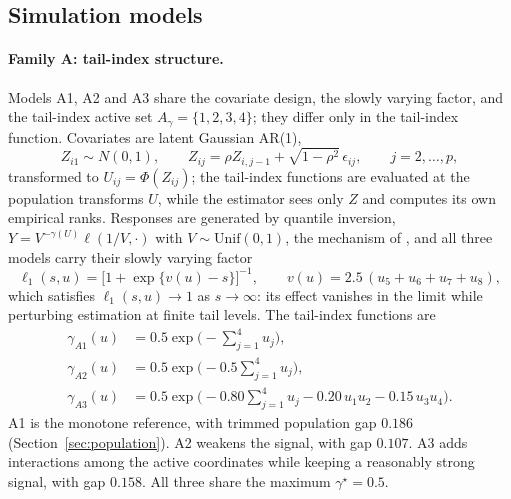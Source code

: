 \documentclass[bj,authoryear]{imsart}
\theoremstyle{plain}
\newcommand{\A}{A}\newcommand{\I}{I_\varepsilon}
\newcommand{\gmax}{\gamma^\star}
\begin{document}
\subsection{Simulation models}\label{sec:models}

\paragraph{Family A: tail-index structure.}
Models A1, A2 and A3 share the covariate design, the slowly varying
factor, and the tail-index active set $\A_\gamma=\{1,2,3,4\}$; they
differ only in the tail-index function. Covariates are latent Gaussian
AR(1),
\[
 Z_{i1}\sim N(0,1),\qquad
 Z_{ij}=\rho Z_{i,j-1}+\sqrt{1-\rho^2}\,\epsilon_{ij},
 \qquad j=2,\ldots,p,
\]
transformed to $U_{ij}=\Phi(Z_{ij})$; the tail-index functions are
evaluated at the population transforms $U$, while the estimator sees
only $Z$ and computes its own empirical ranks. Responses are generated
by quantile inversion, $Y=V^{-\gamma(U)}\ell(1/V,\cdot)$ with
$V\sim\mathrm{Unif}(0,1)$, the mechanism of
\citet{gardesPodgorny2025}, and all three models carry their slowly
varying factor
\[
 \ell_1(s,u)=\bigl[1+\exp\{v(u)-s\}\bigr]^{-1},
 \qquad
 v(u)=2.5\,(u_5+u_6+u_7+u_8),
\]
which satisfies $\ell_1(s,u)\to1$ as $s\to\infty$: its effect vanishes
in the limit while perturbing estimation at finite tail levels. The
tail-index functions are
\begin{align*}
 \gamma_{A1}(u)&=0.5\exp\bigl(-\textstyle\sum_{j=1}^4u_j\bigr),\\
 \gamma_{A2}(u)&=0.5\exp\bigl(-0.5\textstyle\sum_{j=1}^4u_j\bigr),\\
 \gamma_{A3}(u)&=0.5\exp\bigl(-0.80\textstyle\sum_{j=1}^4u_j
 -0.20\,u_1u_2-0.15\,u_3u_4\bigr).
\end{align*}
A1 is the monotone reference, with trimmed population gap $0.186$
(Section~\ref{sec:population}). A2 weakens the signal, with gap
$0.107$. A3 adds interactions among the active coordinates while
keeping a reasonably strong signal, with gap $0.158$. All three share
the maximum $\gmax=0.5$.
\end{document}
